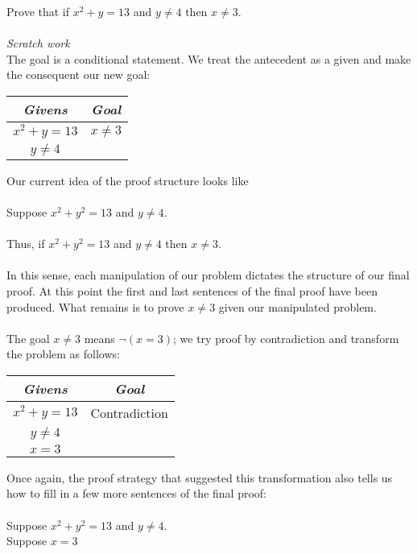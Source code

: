 \documentclass{report}
\begin{document}
Prove that if $x^2+y=13$ and $y\neq4$ then $x\neq3$.\\
\vspace{1mm}\\
\textit{Scratch work}\\
The goal is a conditional statement. We treat the antecedent as a given and make the consequent our new goal:
\begin{center}
\begin{tabular}{c|c}
\textit{Givens}&\textit{Goal}\\
\hline
$x^2+y=13$&$x\neq3$\\
$y\neq4$&
\end{tabular}
\end{center}
Our current idea of the proof structure looks like\\
\vspace{1mm}\\
\indent Suppose $x^2+y^2=13$ and $y\neq4$.\\
\indent{}\\
\indent Thus, if $x^2+y^2=13$ and $y\neq4$ then $x\neq3$.\\
\vspace{1mm}\\
In this sense, each manipulation of our problem dictates the structure of our final proof. At this point the first and last sentences of the final proof have been produced. 
What remains is to prove $x\neq 3$ given our manipulated problem.\\
\vspace{1mm}\\
The goal $x\neq3$ means $\neg(x=3)$; we try proof by contradiction and transform the problem as follows:
\begin{center}
\begin{tabular}{c|c}
\textit{Givens}&\textit{Goal}\\
\hline
$x^2+y=13$&Contradiction\\
$y\neq4$&\\
$x=3$&
\end{tabular}
\end{center}
Once again, the proof strategy that suggested this transformation also tells us how to fill in a few more sentences of the final proof:\\
\vspace{1mm}\\
\indent Suppose $x^2+y^2=13$ and $y\neq4$.\\
\indent\indent Suppose $x=3$\\
\end{document}
